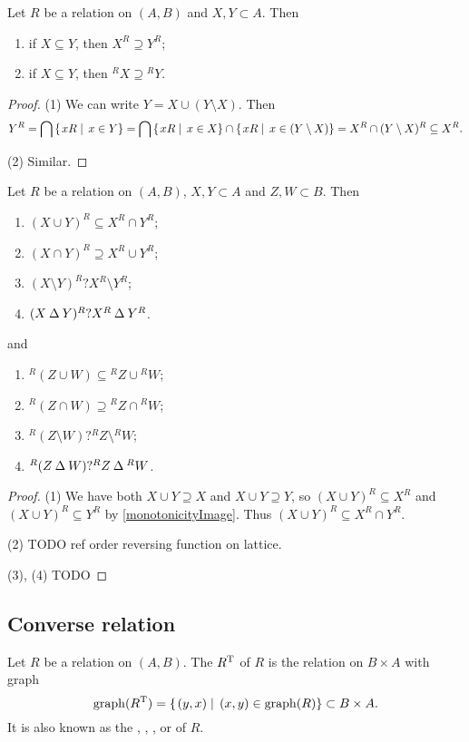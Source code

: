 \begin{corollary} \label{monotonicityCommonality}
Let $R$ be a relation on $(A, B)$ and $X,Y\subset A$. Then
\begin{enumerate}
\item if $X\subseteq Y$, then $X^R \supseteq Y^R$;
\item if $X\subseteq Y$, then ${^RX} \supseteq {^RY}$.
\end{enumerate}
\end{corollary}
\begin{proof}
(1) We can write $Y = X \cup (Y\setminus X)$. Then
\[ Y^R = \bigcap \left\{\left. xR \;\right|\; x\in Y \right\} = \bigcap \left\{\left. xR \;\right|\; x\in X \right\}\cap\left\{\left. xR \;\right|\; x\in (Y\setminus X) \right\} = X^R \cap (Y\setminus X)^R \subseteq X^R. \]

(2) Similar.
\end{proof}
\begin{corollary} \label{commonalityRelation} \label{precommonalityRelation}
Let $R$ be a relation on $(A, B)$, $X,Y\subset A$ and $Z,W\subset B$. Then
\begin{enumerate}
\item $(X\cup Y)^R \subseteq X^R\cap Y^R$;
\item $(X\cap Y)^R \supseteq X^R\cup Y^R$;
\item $(X\setminus Y)^R ? X^R\setminus Y^R$;
\item $(X\mathbin{\Delta} Y)^R ? X^R\mathbin{\Delta} Y^R$.
\end{enumerate}
and
\begin{enumerate}
\item $^R(Z\cup W) \subseteq {^RZ}\cup {^RW}$;
\item $^R(Z\cap W) \supseteq {^RZ}\cap {^RW}$;
\item $^R(Z\setminus W) ? {^RZ}\setminus {^RW}$;
\item $^R(Z\mathbin{\Delta} W) ? {^RZ}\mathbin{\Delta} {^RW}$.
\end{enumerate}
\end{corollary}
\begin{proof}\mbox{}
(1) We have both $X\cup Y \supseteq X$ and $X\cup Y \supseteq Y$, so $(X\cup Y)^R \subseteq X^R$ and $(X\cup Y)^R \subseteq Y^R$ by \ref{monotonicityImage}. Thus $(X\cup Y)^R \subseteq X^R\cap Y^R$.

(2) TODO ref order reversing function on lattice.

(3), (4) TODO
\end{proof}

\subsection{Converse relation}
\begin{definition}
Let $R$ be a relation on $(A, B)$. The  $R^{\mathrm{T}}$ of $R$ is the relation on $B\times A$ with graph
\[ \operatorname{graph}(R^{\mathrm{T}}) = \left\{\left. (y,x) \;\right|\; (x,y)\in \operatorname{graph}(R) \right\} \subset B\times A. \]
It is also known as the , , ,  or  of $R$.
\end{definition}

